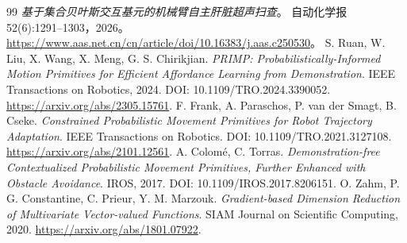 \documentclass[11pt,a4paper]{article}
\numberwithin{equation}{section}
\theoremstyle{definition}
\begin{document}
\begin{thebibliography}{99}
\emph{基于集合贝叶斯交互基元的机械臂自主肝脏超声扫查}。
自动化学报 52(6):1291--1303，2026。
\url{https://www.aas.net.cn/cn/article/doi/10.16383/j.aas.c250530}。
 S. Ruan, W. Liu, X. Wang, X. Meng, G. S. Chirikjian.
\emph{PRIMP: Probabilistically-Informed Motion Primitives for Efficient Affordance Learning from Demonstration}.
IEEE Transactions on Robotics, 2024. DOI: 10.1109/TRO.2024.3390052.
\url{https://arxiv.org/abs/2305.15761}.
 F. Frank, A. Paraschos, P. van der Smagt, B. Cseke.
\emph{Constrained Probabilistic Movement Primitives for Robot Trajectory Adaptation}.
IEEE Transactions on Robotics. DOI: 10.1109/TRO.2021.3127108.
\url{https://arxiv.org/abs/2101.12561}.
 A. Colomé, C. Torras.
\emph{Demonstration-free Contextualized Probabilistic Movement Primitives, Further Enhanced with Obstacle Avoidance}.
IROS, 2017. DOI: 10.1109/IROS.2017.8206151.
 O. Zahm, P. G. Constantine, C. Prieur, Y. M. Marzouk.
\emph{Gradient-based Dimension Reduction of Multivariate Vector-valued Functions}.
SIAM Journal on Scientific Computing, 2020.
\url{https://arxiv.org/abs/1801.07922}.
\end{thebibliography}
\end{document}
